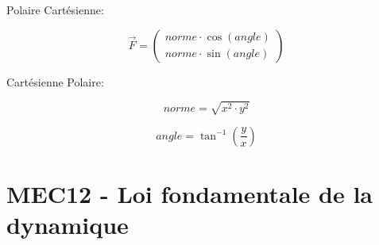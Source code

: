 \documentclass{article}
\begin{document}
Polaire \rightarrow Cartésienne:

\begin{equation}
  \vec{F} = 
  \begin{pmatrix}
    norme \cdot \cos{(angle)} \\
    norme \cdot \sin{(angle)}
  \end{pmatrix} 
\end{equation}

Cartésienne \rightarrow Polaire:

\begin{equation}
  norme = \sqrt{x^2 \cdot y^2}
\end{equation}

\begin{equation}
  angle = \tan^{-1}{(\frac{y}{x})}
\end{equation}

\section{MEC12 - Loi fondamentale de la dynamique}
\end{document}
